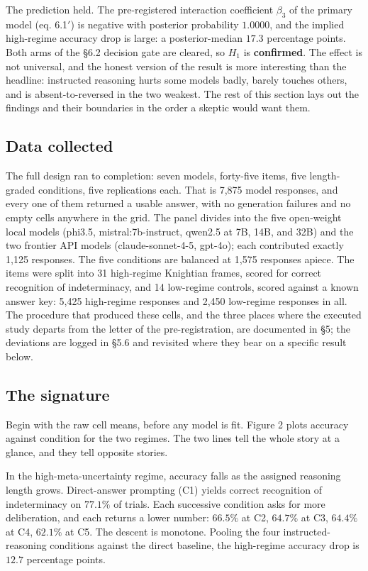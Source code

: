 \documentclass{article}
\begin{document}
The prediction held. The pre-registered interaction coefficient
\(\beta_{3}\) of the primary model (eq. 6.1\ensuremath{\prime}) is negative with posterior
probability \(1.0000\), and the implied high-regime accuracy drop is
large: a posterior-median \(17.3\) percentage points. Both arms of the
\S{}6.2 decision gate are cleared, so \(H_{1}\) is \textbf{confirmed}. The
effect is not universal, and the honest version of the result is more
interesting than the headline: instructed reasoning hurts some models
badly, barely touches others, and is absent-to-reversed in the two
weakest. The rest of this section lays out the findings and their
boundaries in the order a skeptic would want them.

\subsection{Data collected}\label{data-collected}

The full design ran to completion: seven models, forty-five items, five
length-graded conditions, five replications each. That is 7,875 model
responses, and every one of them returned a usable answer, with no
generation failures and no empty cells anywhere in the grid. The panel
divides into the five open-weight local models (phi3.5,
mistral:7b-instruct, qwen2.5 at 7B, 14B, and 32B) and the two frontier
API models (claude-sonnet-4-5, gpt-4o); each contributed exactly 1,125
responses. The five conditions are balanced at 1,575 responses apiece.
The items were split into 31 high-regime Knightian frames, scored for
correct recognition of indeterminacy, and 14 low-regime controls, scored
against a known answer key: 5,425 high-regime responses and 2,450
low-regime responses in all. The procedure that produced these cells,
and the three places where the executed study departs from the letter of
the pre-registration, are documented in \S{}5; the deviations are logged in
\S{}5.6 and revisited where they bear on a specific result below.

\subsection{The signature}\label{the-signature}

Begin with the raw cell means, before any model is fit. Figure 2 plots
accuracy against condition for the two regimes. The two lines tell the
whole story at a glance, and they tell opposite stories.

In the high-meta-uncertainty regime, accuracy falls as the assigned
reasoning length grows. Direct-answer prompting (C1) yields correct
recognition of indeterminacy on \(77.1\%\) of trials. Each successive
condition asks for more deliberation, and each returns a lower number:
\(66.5\%\) at C2, \(64.7\%\) at C3, \(64.4\%\) at C4, \(62.1\%\) at C5.
The descent is monotone. Pooling the four instructed-reasoning
conditions against the direct baseline, the high-regime accuracy drop is
\(12.7\) percentage points.
\end{document}
